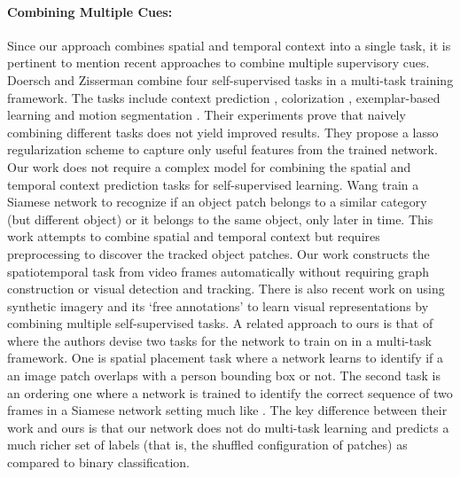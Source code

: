 \documentclass[10pt,twocolumn,letterpaper]{article}
\begin{document}
\paragraph{\textbf{Combining Multiple Cues:}}
Since our approach combines spatial and temporal context into a single task, it is pertinent to mention recent approaches to combine multiple supervisory cues. Doersch and Zisserman \cite{doersch2017multi} combine four self-supervised tasks in a multi-task training framework. The tasks include context prediction \cite{doersch2015unsupervised}, colorization \cite{zhang2016colorful}, exemplar-based learning \cite{dosovitskiy2014discriminative} and motion segmentation \cite{pathak2017learning}. Their experiments prove that naively combining different tasks does not yield improved results. They propose a lasso regularization scheme to capture only useful features from the trained network. Our work does not require a complex model for combining the spatial and temporal context prediction tasks for self-supervised learning. Wang \etal \cite{wang2017transitive} train a Siamese network to recognize if an object patch belongs to a similar category (but different object) or it belongs to the same object, only later in time. This work attempts to combine spatial and temporal context but requires preprocessing to discover the tracked object patches. Our work constructs the spatiotemporal task from video frames automatically without requiring graph construction or visual detection and tracking. There is also recent work on using synthetic imagery and its `free annotations' to learn visual representations \cite{ren2017cross} by combining multiple self-supervised tasks. A related approach to ours is that of \cite{sumer2017self} where the authors devise two tasks for the network to train on in a multi-task framework. One is spatial placement task where a network learns to identify if a an image patch overlaps with a person bounding box or not. The second task is an ordering one where a network is trained to identify the correct sequence of two frames in a Siamese network setting much like \cite{misra2016shuffle}. The key difference between their work and ours is that our network does not do multi-task learning and predicts a much richer set of labels (that is, the shuffled configuration of patches) as compared to binary classification. 
\end{document}
